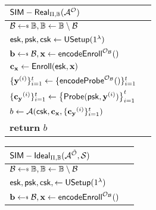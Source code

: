 \begin{figure}[h]
	\begin{center}

		\begin{subfigure}[t]{0.49\textwidth}
		\begin{tabular}{l c}
			${\sf SIM-Real}_{\Pi, \mathbb{B}}(\mathcal{A}^\mathcal{O})$\\

			\hline

			$\mathcal{B} \getsdollar \mathbb{B}, \mathbb{B} \gets \mathbb{B} \setminus \mathcal{B}$ \\

			${\sf esk}, {\sf psk}, {\sf csk} \gets {\sf USetup}(1^\lambda)$ \\

			$ \mathbf{b} \getsdollar \mathcal{B}, \mathbf{x} \gets {\sf encodeEnroll}^{\mathcal{O}_{\mathcal{B}}}()$ \\

			$\mathbf{c_x} \gets {\sf Enroll}({\sf esk}, \mathbf{x})$ \\

			$\{\mathbf{y}^{(i)}\}_{i=1}^t \gets \{{\sf encodeProbe}^{\mathcal{O}_{\mathcal{B}}}() \}_{i=1}^t $ \\
			
			$\{ \mathbf{c_y}^{(i)} \}_{i=1}^t \gets \left\{ {\sf Probe}( {\sf psk}, \mathbf{y}^{(i)} ) \right \}_{i=1}^t$ \\

			$b \gets \mathcal{A} ({\sf csk}, \mathbf{c_x}, \{\mathbf{c_y}^{(i)}\}_{i=1}^t )$ \\

			\textbf{return} $b$
			
		\end{tabular}
		\end{subfigure}
		\begin{subfigure}[t]{0.49\textwidth}
		\begin{tabular}{l c}
			${\sf SIM-Ideal}_{\Pi, \mathbb{B}}(\mathcal{A}^{\tilde{\mathcal{O}}}, \mathcal{S} )$\\

			\hline

			$\mathcal{B} \getsdollar \mathbb{B}, \mathbb{B} \gets \mathbb{B} \setminus \mathcal{B}$ \\

			${\sf esk}, {\sf psk}, {\sf csk}, \gets {\sf USetup}(1^\lambda)$ \\

			$ \mathbf{b} \getsdollar \mathcal{B}, \mathbf{x} \gets {\sf encodeEnroll}^{\mathcal{O}_{\mathcal{B}}}()$ \\


\end{tabular}
\end{subfigure}
\end{center}
\end{figure}
